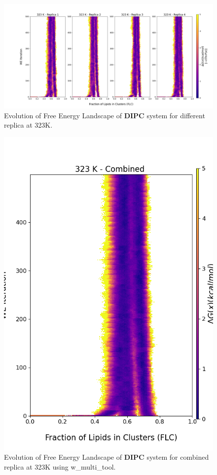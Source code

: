 \documentclass{biophys-new}
\begin{document}
\begin{figure}[hbt!]
\centering
\includegraphics[width=1.1\linewidth]{all_plots/ClusterLipids2Total/DPPC_DIPC_CHOL/323K/Evolution_DIPC_323_ClusterLipids2Total.png}
\caption{Evolution of Free Energy Landscape of \textbf{DIPC} system for different replica at 323K.}
\label{fig:view}

\end{figure}

\begin{figure}[hbt!]
\centering
\includegraphics[width=0.8\linewidth]{all_plots/ClusterLipids2Total/DPPC_DIPC_CHOL/323K/Evolution_DIPC_MULTI__323_ClusterLipids2Total.png}
\caption{Evolution of Free Energy Landscape of \textbf{DIPC} system for combined replica at 323K using w\_multi\_tool.}
\label{fig:view}

\end{figure}
\end{document}
